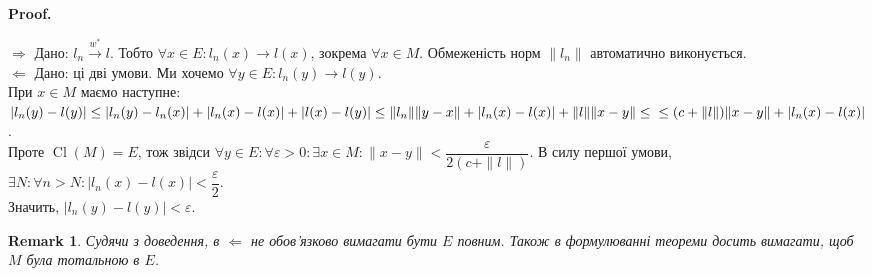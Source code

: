 \documentclass[a4paper, 10pt]{article}
\makeatletter
\def\rightproof{$\boxed{\Rightarrow}$ }
\def\leftproof{$\boxed{\Leftarrow}$ }
\theoremstyle{theoremdd}
\theoremstyle{theoremdd}
\theoremstyle{theoremdd}
\theoremstyle{theoremdd}
\theoremstyle{theoremdd}
\theoremstyle{theoremdd}
\newtheorem{remark}[theorem]{Remark}
\theoremstyle{theoremdd}
\theoremstyle{theoremdd}
\newcommand{\toweakstar}{\overset{w^*}{\to}}
\renewenvironment{proof}[1][Proof.\\]{\par
\pushQED{\hfill \qed}%
\normalfont \topsep6\p@\@plus6\p@\relax
\trivlist
\item\relax
{\bfseries
#1\@addpunct{.}}\hspace\labelsep\ignorespaces
}{%
\popQED\endtrivlist\@endpefalse
}
\DeclareMathOperator{\Cl}{Cl}
\makeatother
\begin{document}
\begin{proof}
\rightproof Дано: $l_n \toweakstar l$. Тобто $\forall x \in E: l_n(x) \to l(x)$, зокрема $\forall x \in M$. Обмеженість норм $\|l_n\|$ автоматично виконується.
\bigskip \\
\leftproof Дано: ці дві умови. Ми хочемо $\forall y \in E: l_n(y) \to l(y)$.\\
При $x \in M$ маємо наступне:\\
$|l_n(y) - l(y)| \leq |l_n(y) - l_n(x)| + |l_n(x) - l(x)| + |l(x) - l(y)| \leq \| l_n \| \| y - x \| + |l_n(x) - l(x)| + \|l\| \|x-y\| \leq \\
\leq (c + \|l\|) \|x-y\| + |l_n(x) - l(x)|$.\\
Проте $\Cl(M) = E$, тож звідси $\forall y \in E: \forall \varepsilon > 0: \exists x \in M: \|x-y\| < \dfrac{\varepsilon}{2(c+ \|l\|)}$. В силу першої умови, $\exists N: \forall n > N: |l_n(x) - l(x)| < \dfrac{\varepsilon}{2}$.\\
Значить, $|l_n(y) - l(y)| < \varepsilon$.
\end{proof}

\begin{remark}
Судячи з доведення, в \leftproof не обов'язково вимагати бути $E$ повним. Також в формулюванні теореми досить вимагати, щоб $M$ була тотальною в $E$.
\end{remark}

\newpage
\end{document}
